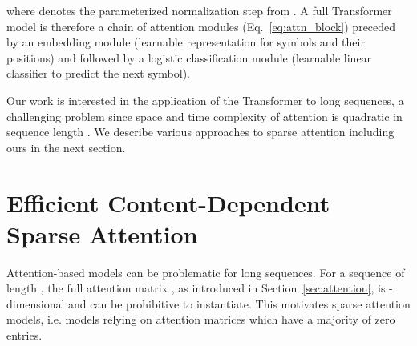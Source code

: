 \documentclass[a4paper]{article}
\begin{document}
where  denotes the parameterized normalization step 
from \cite{layernorm2016}. A full Transformer model is therefore a chain of
attention modules (Eq.~\ref{eq:attn_block}) preceded by an embedding 
module (learnable representation for symbols and their positions) and followed
by a logistic classification module (learnable linear classifier to predict
the next symbol).

Our work is interested in the application of the Transformer to long sequences,
a challenging problem since space and time complexity of attention is quadratic 
in sequence length . We describe various approaches to sparse attention 
including ours in the next section.

\begin{comment}
\section{Sparse Attention as an Integer Programming Problem}
The sparse attention problem with an attention budget of 
can be formulated as an integer programming problem as follows.
Define the  matrix  as  if 
position  attends to position  and 
otherwise. Then the sparse attention function can be written as:

This defines the full  
attention matrix sparsified using  as 
. The final objective function of maximizing log 
likelihood using
the attention function is subject to the sparse attention constraint 
 and . This
turns the final problem into a constrained integer programming problem,
solving which exactly is NP-hard.
 
This motivates the use of -means clustering
as a tractable approximation
to this NP-hard problem. Similar approaches using LP relaxations
have been used in -means and -median clustering (see
e.g., \cite{charikar2002constant, awasthi2015relax}.
\end{comment}

\section{Efficient Content-Dependent Sparse Attention}\label{sec:ksparse}
Attention-based models can be problematic for long sequences. For a sequence of 
length , the full attention matrix , as introduced in Section~\ref{sec:attention}, 
is -dimensional and can be prohibitive to instantiate. 
This motivates sparse attention models, i.e. models relying on attention matrices
which have a majority of zero entries. 
\end{document}

